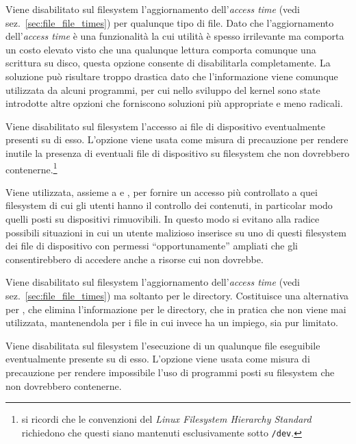 \begin{basedescript}{\desclabelwidth{2.0cm}\desclabelstyle{\nextlinelabel}}
\item[\constd{MS\_NOATIME}] Viene disabilitato sul filesystem l'aggiornamento
  dell'\textit{access time} (vedi sez.~\ref{sec:file_file_times}) per
  qualunque tipo di file. Dato che l'aggiornamento dell'\textit{access time} è
  una funzionalità la cui utilità è spesso irrilevante ma comporta un costo
  elevato visto che una qualunque lettura comporta comunque una scrittura su
  disco, questa opzione consente di disabilitarla completamente. La soluzione
  può risultare troppo drastica dato che l'informazione viene comunque
  utilizzata da alcuni programmi, per cui nello sviluppo del kernel sono state
  introdotte altre opzioni che forniscono soluzioni più appropriate e meno
  radicali.

\item[\constd{MS\_NODEV}] Viene disabilitato sul filesystem l'accesso ai file
  di dispositivo eventualmente presenti su di esso. L'opzione viene usata come
  misura di precauzione per rendere inutile la presenza di eventuali file di
  dispositivo su filesystem che non dovrebbero contenerne.\footnote{si ricordi
    che le convenzioni del \textit{Linux Filesystem Hierarchy Standard}
    richiedono che questi siano mantenuti esclusivamente sotto \texttt{/dev}.}

  Viene utilizzata, assieme a  e , per
  fornire un accesso più controllato a quei filesystem di cui gli utenti hanno
  il controllo dei contenuti, in particolar modo quelli posti su dispositivi
  rimuovibili. In questo modo si evitano alla radice possibili situazioni in
  cui un utente malizioso inserisce su uno di questi filesystem dei file di
  dispositivo con permessi ``opportunamente'' ampliati che gli consentirebbero
  di accedere anche a risorse cui non dovrebbe.

\item[\constd{MS\_NODIRATIME}] Viene disabilitato sul filesystem
  l'aggiornamento dell'\textit{access time} (vedi
  sez.~\ref{sec:file_file_times}) ma soltanto per le directory. Costituisce
  una alternativa per , che elimina l'informazione per le
  directory, che in pratica che non viene mai utilizzata, mantenendola per i
  file in cui invece ha un impiego, sia pur limitato.

\item[\constd{MS\_NOEXEC}] Viene disabilitata sul filesystem l'esecuzione di un
  qualunque file eseguibile eventualmente presente su di esso. L'opzione viene
  usata come misura di precauzione per rendere impossibile l'uso di programmi
  posti su filesystem che non dovrebbero contenerne.


\end{basedescript}
